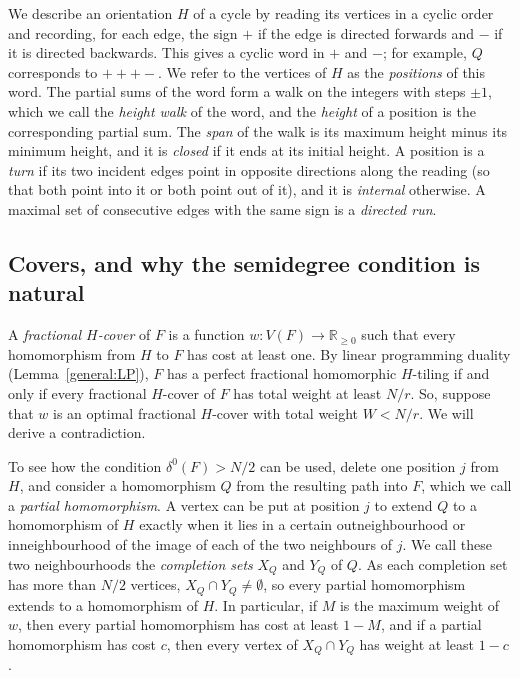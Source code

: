 We describe an orientation $H$ of a cycle by reading its vertices in a cyclic order and recording, for each edge, the sign $+$ if the edge is directed forwards and $-$ if it is directed backwards. This gives a cyclic word in $+$ and $-$; for example, $Q$ corresponds to $+++-$. We refer to the vertices of $H$ as the \emph{positions} of this word. The partial sums of the word form a walk on the integers with steps $\pm1$, which we call the \emph{height walk} of the word, and the \emph{height} of a position is the corresponding partial sum. The \emph{span} of the walk is its maximum height minus its minimum height, and it is \emph{closed} if it ends at its initial height.
A position is a \emph{turn} if its two incident edges point in opposite directions along the reading (so that both point into it or both point out of it), and it is \emph{internal} otherwise. A maximal set of consecutive edges with the same sign is a \emph{directed run}.

\subsection{Covers, and why the semidegree condition is natural}\label{sec:sketch-covers}
A \emph{fractional $H$-cover} of $F$ is a function $w:V(F)\to\mathbb R_{\ge0}$ such that every homomorphism from $H$ to $F$ has cost at least one.
By linear programming duality (Lemma~\ref{general:LP}), $F$ has a perfect fractional homomorphic $H$-tiling if and only if every fractional $H$-cover of $F$ has total weight at least $N/r$. So, suppose that $w$ is an optimal fractional $H$-cover with total weight $W<N/r$. We will derive a contradiction.

To see how the condition $\delta^0(F)>N/2$ can be used, delete one position $j$ from $H$, and consider a homomorphism $Q$ from the resulting path into $F$, which we call a \emph{partial homomorphism}. A vertex can be put at position $j$ to extend $Q$ to a homomorphism of $H$ exactly when it lies in a certain outneighbourhood or inneighbourhood of the image of each of the two neighbours of $j$. We call these two neighbourhoods the \emph{completion sets} $X_Q$ and $Y_Q$ of $Q$.
As each completion set has more than $N/2$ vertices, $X_Q\cap Y_Q\neq\emptyset$, so every partial homomorphism extends to a homomorphism of $H$. In particular, if $M$ is the maximum weight of $w$, then every partial homomorphism has cost at least $1-M$, and if a partial homomorphism has cost $c$, then every vertex of $X_Q\cap Y_Q$ has weight at least $1-c$.

